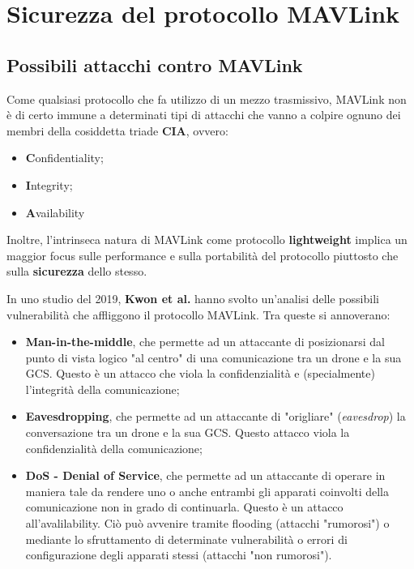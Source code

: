 \documentclass[a4paper, 12pt, oneside]{article}
\theoremstyle{definition}
\begin{document}
\newpage

\section{Sicurezza del protocollo MAVLink}
\subsection{Possibili attacchi contro MAVLink}
Come qualsiasi protocollo che fa utilizzo di un mezzo trasmissivo, MAVLink non è di certo immune a determinati tipi di attacchi che vanno a colpire ognuno dei membri della cosiddetta triade \textbf{CIA}, ovvero:

\begin{itemize}
    \item \textbf{C}onfidentiality;
    \item \textbf{I}ntegrity;
    \item \textbf{A}vailability
\end{itemize}

Inoltre, l'intrinseca natura di MAVLink come protocollo \textbf{lightweight} implica un maggior focus sulle performance e sulla portabilità del protocollo piuttosto che sulla \textbf{sicurezza} dello stesso.

In uno studio \cite{8425627} del 2019, \textbf{Kwon et al.} hanno svolto un'analisi delle possibili vulnerabilità che affliggono il protocollo MAVLink. Tra queste si annoverano:

\begin{itemize}
    \item \textbf{Man-in-the-middle}, che permette ad un attaccante di posizionarsi dal punto di vista logico "al centro" di una comunicazione tra un drone e la sua GCS. Questo è un attacco che viola la confidenzialità e (specialmente) l'integrità della comunicazione;
    \item \textbf{Eavesdropping}, che permette ad un attaccante di "origliare" (\textit{eavesdrop}) la conversazione tra un drone e la sua GCS. Questo attacco viola la confidenzialità della comunicazione;
    \item \textbf{DoS - Denial of Service}, che permette ad un attaccante di operare in maniera tale da rendere uno o anche entrambi gli apparati coinvolti della comunicazione non in grado di continuarla. Questo è un attacco all'avalilability. Ciò può avvenire tramite flooding (attacchi "rumorosi") o mediante lo sfruttamento di determinate vulnerabilità o errori di configurazione degli apparati stessi (attacchi "non rumorosi").
\end{itemize}
\end{document}
